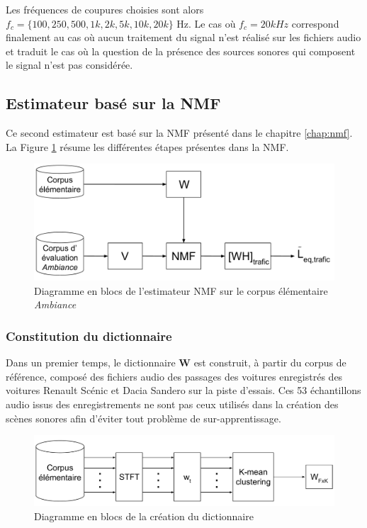 Les fréquences de coupures choisies sont alors $f_c = \lbrace 100, 250, 500, 1k, 2k, 5k, 10k, 20k \rbrace$ Hz. Le cas où $f_c = 20 kHz$ correspond finalement au cas où aucun traitement du signal n'est réalisé sur les fichiers audio et traduit le cas où la question de la présence des sources sonores qui composent le signal n'est pas considérée.

\subsection{Estimateur basé sur la NMF}
Ce second estimateur est basé sur la NMF présenté dans le chapitre \ref{chap:nmf}. 
La Figure \ref{fig:nmf_ambiance} résume les différentes étapes présentes dans la NMF.

\begin{figure}[ht]
\centering
\includegraphics[width=0.7\linewidth]{./figures/NMF/NMF_ambiance.pdf}
\caption{Diagramme en blocs de l'estimateur NMF sur le corpus élémentaire \textit{Ambiance}}
\label{fig:nmf_ambiance}
\end{figure}


\subsubsection{Constitution du dictionnaire}
Dans un premier temps, le dictionnaire $\mathbf{W}$ est construit, à partir du corpus de référence, composé des fichiers audio des passages des voitures enregistrés des voitures Renault Scénic et Dacia Sandero sur la piste d'essais. Ces 53 échantillons audio issus des enregistrements ne sont pas ceux utilisés dans la création des scènes sonores afin d'éviter tout problème de sur-apprentissage.

\begin{figure}[hbtp]
\centering
\includegraphics[width=.9\linewidth]{./figures/NMF/creation_dictionaire.pdf}
\caption{Diagramme en blocs de la création du dictionnaire}
\label{fig:creation_W}
\end{figure}


